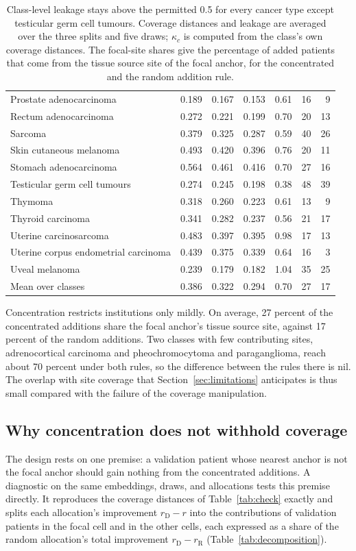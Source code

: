 \begin{table}[htbp]
\begin{tabular}{@{}lrrrrrr@{}}
Prostate adenocarcinoma & 0.189 & 0.167 & 0.153 & 0.61 & 16 & 9 \\
Rectum adenocarcinoma & 0.272 & 0.221 & 0.199 & 0.70 & 20 & 13 \\
Sarcoma & 0.379 & 0.325 & 0.287 & 0.59 & 40 & 26 \\
Skin cutaneous melanoma & 0.493 & 0.420 & 0.396 & 0.76 & 20 & 11 \\
Stomach adenocarcinoma & 0.564 & 0.461 & 0.416 & 0.70 & 27 & 16 \\
Testicular germ cell tumours & 0.274 & 0.245 & 0.198 & 0.38 & 48 & 39 \\
Thymoma & 0.318 & 0.260 & 0.223 & 0.61 & 13 & 9 \\
Thyroid carcinoma & 0.341 & 0.282 & 0.237 & 0.56 & 21 & 17 \\
Uterine carcinosarcoma & 0.483 & 0.397 & 0.395 & 0.98 & 17 & 13 \\
Uterine corpus endometrial carcinoma & 0.439 & 0.375 & 0.339 & 0.64 & 16 & 3 \\
Uveal melanoma & 0.239 & 0.179 & 0.182 & 1.04 & 35 & 25 \\
\midrule
Mean over classes & 0.386 & 0.322 & 0.294 & 0.70 & 27 & 17 \\
\bottomrule
\end{tabular}
\caption{Class-level leakage stays above the permitted 0.5 for every cancer type except testicular germ cell tumours. Coverage distances and leakage are averaged over the three splits and five draws; $\kappa_c$ is computed from the class's own coverage distances. The focal-site shares give the percentage of added patients that come from the tissue source site of the focal anchor, for the concentrated and the random addition rule.}
\label{tab:class-check}
\end{table}

Concentration restricts institutions only mildly. On average, 27 percent of the concentrated additions share the focal anchor's tissue source site, against 17 percent of the random additions. Two classes with few contributing sites, adrenocortical carcinoma and pheochromocytoma and paraganglioma, reach about 70 percent under both rules, so the difference between the rules there is nil. The overlap with site coverage that Section~\ref{sec:limitations} anticipates is thus small compared with the failure of the coverage manipulation.

\subsection{Why concentration does not withhold coverage}
\label{sec:diagnosis}
The design rests on one premise: a validation patient whose nearest anchor is not the focal anchor should gain nothing from the concentrated additions. A diagnostic on the same embeddings, draws, and allocations tests this premise directly. It reproduces the coverage distances of Table~\ref{tab:check} exactly and splits each allocation's improvement $r_{\mathrm D}-r$ into the contributions of validation patients in the focal cell and in the other cells, each expressed as a share of the random allocation's total improvement $r_{\mathrm D}-r_{\mathrm R}$ (Table~\ref{tab:decomposition}).

